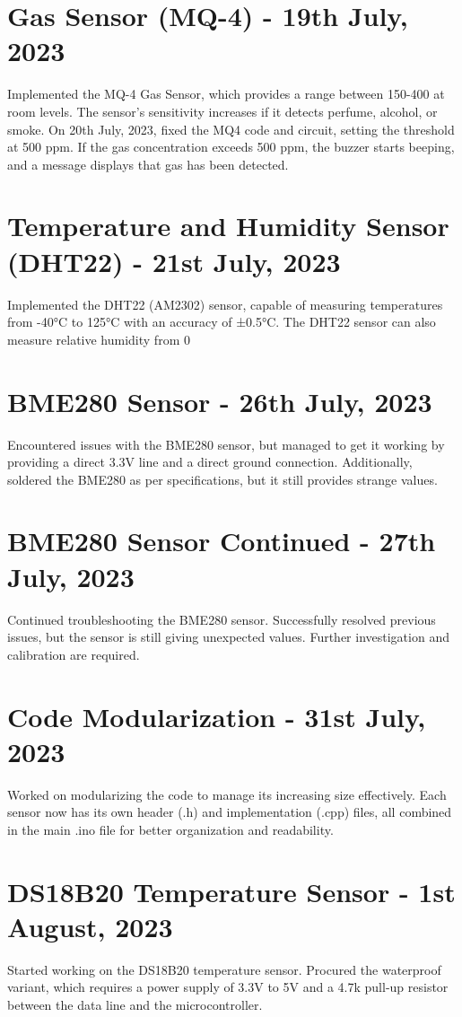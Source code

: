 \documentclass{article}
\begin{document}
\section*{Gas Sensor (MQ-4) - 19th July, 2023}
Implemented the MQ-4 Gas Sensor, which provides a range between 150-400 at room levels. The sensor's sensitivity increases if it detects perfume, alcohol, or smoke. On 20th July, 2023, fixed the MQ4 code and circuit, setting the threshold at 500 ppm. If the gas concentration exceeds 500 ppm, the buzzer starts beeping, and a message displays that gas has been detected.

\section*{Temperature and Humidity Sensor (DHT22) - 21st July, 2023}
Implemented the DHT22 (AM2302) sensor, capable of measuring temperatures from -40°C to 125°C with an accuracy of ±0.5°C. The DHT22 sensor can also measure relative humidity from 0%

\section*{BME280 Sensor - 26th July, 2023}
Encountered issues with the BME280 sensor, but managed to get it working by providing a direct 3.3V line and a direct ground connection. Additionally, soldered the BME280 as per specifications, but it still provides strange values.

\section*{BME280 Sensor Continued - 27th July, 2023}
Continued troubleshooting the BME280 sensor. Successfully resolved previous issues, but the sensor is still giving unexpected values. Further investigation and calibration are required.

\section*{Code Modularization - 31st July, 2023}
Worked on modularizing the code to manage its increasing size effectively. Each sensor now has its own header (.h) and implementation (.cpp) files, all combined in the main .ino file for better organization and readability.

\section*{DS18B20 Temperature Sensor - 1st August, 2023}
Started working on the DS18B20 temperature sensor. Procured the waterproof variant, which requires a power supply of 3.3V to 5V and a 4.7k pull-up resistor between the data line and the microcontroller.
\end{document}
